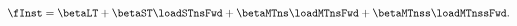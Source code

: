 \begin{equation} \label{eq:nNSSfwd}
	\fInst = \betaLT + \betaST \loadSTnsFwd + \betaMTns \loadMTnsFwd
	+ \betaMTnss \loadMTnssFwd.
\end{equation}